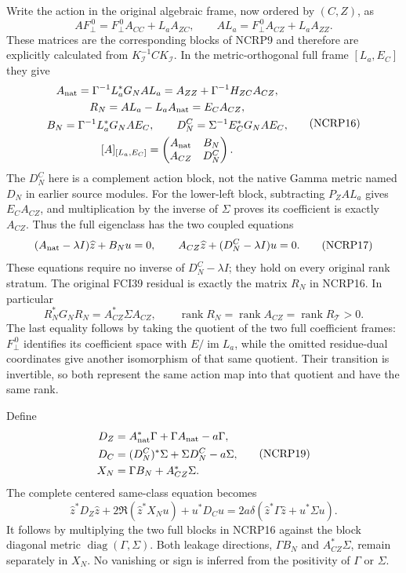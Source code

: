 Write the action in the original algebraic frame, now ordered by
$(C,Z)$, as
\[
 A F_\perp^{\,0}=F_\perp^{\,0}A_{CC}+L_aA_{ZC},\qquad
 A L_a=F_\perp^{\,0}A_{CZ}+L_aA_{ZZ}.
 \tag{NCRP15}
\]
These matrices are the corresponding blocks of NCRP9 and therefore
are explicitly calculated from $K_{\mathcal I}^{-1}CK_{\mathcal I}$.
In the metric-orthogonal full frame $[L_a,E_C]$ they give
\[
 \begin{gathered}
 A_{\rm nat}=\Gamma^{-1}L_a^*G_NAL_a
              =A_{ZZ}+\Gamma^{-1}H_{ZC}A_{CZ},\\
 R_N=AL_a-L_aA_{\rm nat}=E_CA_{CZ},\\
 B_N=\Gamma^{-1}L_a^*G_NAE_C,\qquad
 D_N^{C}=\Sigma^{-1}E_C^*G_NAE_C,\\
 [A]_{[L_a,E_C]}
       =\begin{pmatrix}A_{\rm nat}&B_N\\ A_{CZ}&D_N^{C}\end{pmatrix}.
 \end{gathered}                                                   \tag{NCRP16}
\]
The $D_N^{C}$ here is a complement action block, not the native
Gamma metric named $D_N$ in earlier source modules.
For the lower-left block, subtracting $P_ZAL_a$ gives
$E_CA_{CZ}$, and multiplication by the inverse of $\Sigma$
proves its coefficient is exactly $A_{CZ}$.
Thus the full eigenclass has the two coupled equations
\[
 (A_{\rm nat}-\lambda I)\widehat z+B_Nu=0,\qquad
 A_{CZ}\widehat z+(D_N^{C}-\lambda I)u=0 .
 \tag{NCRP17}
\]
These equations require no inverse of $D_N^C-\lambda I$;
they hold on every original rank stratum.
The original FCI39 residual is exactly the matrix $R_N$ in
NCRP16. In particular
\[
 R_N^*G_NR_N=A_{CZ}^*\Sigma A_{CZ},\qquad
 \operatorname{rank}R_N=\operatorname{rank}A_{CZ}
                         =\operatorname{rank}R_{\mathcal T}>0 .
 \tag{NCRP18}
\]
The last equality follows by taking the quotient of the two full
coefficient frames: $F_\perp^{\,0}$ identifies its coefficient space
with $E/\operatorname{im}L_a$, while the omitted residue-dual
coordinates give another isomorphism of that same quotient.
Their transition is invertible, so both represent the same action
map into that quotient and have the same rank.

Define
\[
 \begin{split}
 D_Z&=A_{\rm nat}^*\Gamma+\Gamma A_{\rm nat}-a\Gamma,\\
 D_C&=(D_N^{C})^*\Sigma+\Sigma D_N^{C}-a\Sigma,\\
 X_N&=\Gamma B_N+A_{CZ}^*\Sigma.
 \end{split}                                                     \tag{NCRP19}
\]
The complete centered same-class equation becomes
\[
 \boxed{\quad
 \widehat z^*D_Z\widehat z+
    2\Re(\widehat z^*X_Nu)+u^*D_Cu
 =2a\delta(\widehat z^*\Gamma\widehat z+u^*\Sigma u).
 \quad}                                                         \tag{NCRP20}
\]
It follows by multiplying the two full blocks in NCRP16 against
the block diagonal metric $\operatorname{diag}(\Gamma,\Sigma)$.
Both leakage directions, $\Gamma B_N$ and $A_{CZ}^*\Sigma$,
remain separately in $X_N$. No vanishing or sign is inferred from
the positivity of $\Gamma$ or $\Sigma$.

